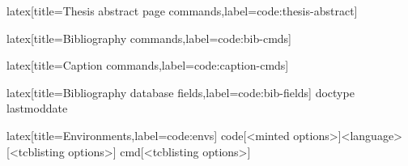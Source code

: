 %
\begin{code}[firstnumber=last]{latex}[title={Thesis abstract page commands},label=code:thesis-abstract]
\makethesisabstract
\end{code}
%
\begin{code}[firstnumber=last]{latex}[title={Bibliography commands},label=code:bib-cmds]
\makebibliography[<options>]
\end{code}
%
\begin{code}[firstnumber=last]{latex}[title={Caption commands},label=code:caption-cmds]
\end{code}
%
\begin{code}[firstnumber=last]{latex}[title={Bibliography database fields},label=code:bib-fields]
doctype
lastmoddate
\end{code}
%
\begin{code}[firstnumber=last]{latex}[title={Environments},label=code:envs]
{code}[<minted options>]{<language>}[<tcblisting options>]
{cmd}[<tcblisting options>]
\end{code}

